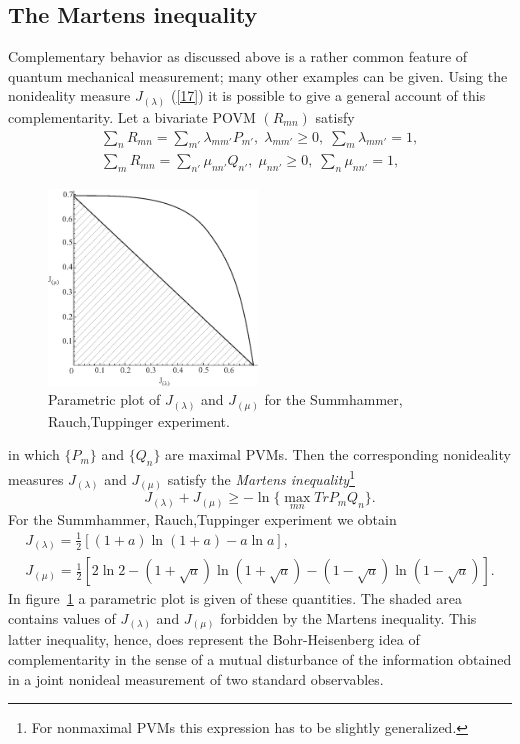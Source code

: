 \documentclass[12pt]{article}
\begin{document}
{\subsection{The Martens inequality}\label{sec2.2}
Complementary behavior as discussed above is a rather common
feature of quantum mechanical measurement; many other examples can
be given\cite{dM2002}. Using the nonideality measure
$J_{(\lambda)}$ (\ref{17}) it is possible to give a general
account of this complementarity\cite{MadM90}. Let a bivariate POVM
$(R_{mn})$ satisfy \begin{equation}\label{2.2.1}
\begin{array}{l}
\sum_n R_{mn} = \sum_{m'} \lambda_{mm'} P_{m'},\; \lambda_{mm'}
\geq 0,\; \sum_m \lambda_{mm'} = 1,\\
\sum_m R_{mn} = \sum_{n'} \mu_{nn'} Q_{n'},\; \mu_{nn'} \geq 0,\;
\sum_n \mu_{nn'} = 1,
\end{array}
 \end{equation}
\begin{figure}[t]
\centerline{\includegraphics[height=5.2cm]{grofi100}}
 \caption{Parametric plot of $J_{(\lambda)}$
and $J_{(\mu)}$ for the Summhammer, Rauch,Tuppinger experiment.}
 \label{fig4}
\end{figure}
 in which $\{P_m\}$ and $\{Q_n\}$ are maximal PVMs.
Then the corresponding nonideality measures $J_{(\lambda)}$ and
$J_{(\mu)}$ satisfy the \textit{Martens inequality}\footnote{For
nonmaximal PVMs this expression has to be slightly
generalized\cite{MadM90}.}
\[ J_{(\lambda)} +
J_{(\mu)} \geq -\ln \{\max_{mn} Tr P_m Q_n\}.\]
 For the Summhammer, Rauch,Tuppinger experiment
we obtain
\[\begin{array}{l}
J_{(\lambda)}=\frac{1}{2}[(1+a)\ln(1+a)-a\ln a],\\
J_{(\mu)}=\frac{1}{2}[2\ln2-(1+\sqrt{a})\ln(1+\sqrt{a})-
(1-\sqrt{a})\ln(1-\sqrt{a})].
\end{array}\]
In figure~\ref{fig4} a parametric plot is given of these
quantities. The shaded area contains values of $J_{(\lambda)}$ and
$J_{(\mu)}$ forbidden by the Martens inequality. This latter
inequality, hence, does represent the Bohr-Heisenberg idea of
complementarity in the sense of a mutual disturbance of the
information obtained in a joint nonideal measurement of two
standard observables.

}
\end{document}
